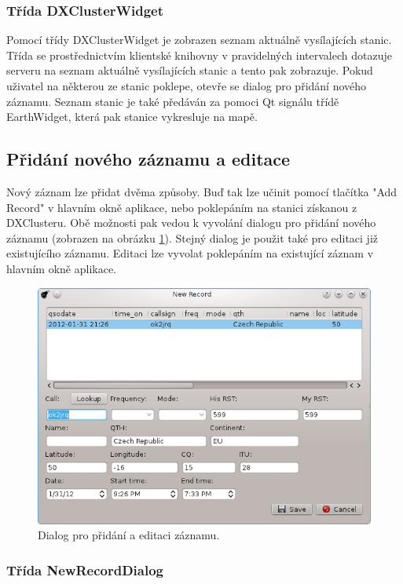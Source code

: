 \subsubsection{Třída DXClusterWidget}

Pomocí třídy DXClusterWidget je zobrazen seznam aktuálně vysílajících stanic. Třída se prostřednictvím klientské knihovny
v pravidelných intervalech dotazuje
serveru na seznam aktuálně vysílajících stanic a tento pak zobrazuje. Pokud uživatel na některou ze stanic poklepe, otevře se 
dialog pro přidání nového záznamu. Seznam stanic je také předáván za pomoci Qt signálu třídě EarthWidget, která pak stanice
vykresluje na mapě.

\subsection{Přidání nového záznamu a editace}

Nový záznam lze přidat dvěma způsoby. Buď tak lze učinit pomocí tlačítka "Add Record" v hlavním okně aplikace, nebo poklepáním
na stanici získanou z DXClusteru. Obě možnosti pak vedou k vyvolání dialogu pro přidání nového záznamu
(zobrazen na obrázku \ref{fig:novy_zaznam}). Stejný dialog je použit
také pro editaci již existujícího záznamu. Editaci lze vyvolat poklepáním na existující záznam v hlavním okně aplikace.

\begin{figure}[h]
\centering
\includegraphics[trim=0cm 0cm 0cm 0cm, scale=0.9]{fig/ham4}
\caption{Dialog pro přidání a editaci záznamu.}
\label{fig:novy_zaznam}
\end{figure}

\subsubsection{Třída NewRecordDialog}

